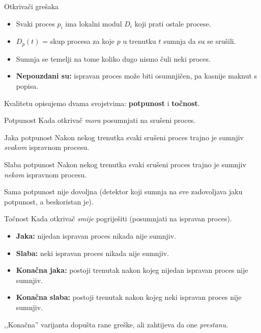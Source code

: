 \documentclass[aspectratio=169,11pt]{beamer}
\begin{document}
\begin{frame}{Otkrivači grešaka}
  \begin{itemize}
    \item Svaki proces $p_i$ ima lokalni modul $D_i$ koji prati ostale procese.
    \item $D_p(t)$ = skup procesa za koje $p$ u trenutku $t$ sumnja da su se
      srušili.
    \item Sumnja se temelji na tome koliko dugo nismo čuli neki proces.
    \item \textbf{Nepouzdani su:} ispravan proces može biti osumnjičen, pa kasnije
      maknut s popisa.
  \end{itemize}
  \vfill
  Kvalitetu opisujemo dvama svojstvima: \textbf{potpunost} i \textbf{točnost}.
\end{frame}

\begin{frame}{Potpunost}
  Kada otkrivač \emph{mora} posumnjati na srušeni proces.
  \begin{block}{Jaka potpunost}
    Nakon nekog trenutka svaki srušeni proces trajno je sumnjiv \emph{svakom}
    ispravnom procesu.
  \end{block}
  \begin{block}{Slaba potpunost}
    Nakon nekog trenutka svaki srušeni proces trajno je sumnjiv \emph{nekom}
    ispravnom procesu.
  \end{block}
  \vfill
  \footnotesize Sama potpunost nije dovoljna (detektor koji sumnja na sve
  zadovoljava jaku potpunost, a beskoristan je).
\end{frame}

\begin{frame}{Točnost}
  Kada otkrivač \emph{smije} pogriješiti (posumnjati na ispravan proces).
  \begin{itemize}
    \item \textbf{Jaka:} nijedan ispravan proces nikada nije sumnjiv.
    \item \textbf{Slaba:} neki ispravan proces nikada nije sumnjiv.
    \item \textbf{Konačna jaka:} postoji trenutak nakon kojeg nijedan ispravan
      proces nije sumnjiv.
    \item \textbf{Konačna slaba:} postoji trenutak nakon kojeg neki ispravan
      proces nije sumnjiv.
  \end{itemize}
  \vfill
  \footnotesize ,,Konačna'' varijanta dopušta rane greške, ali zahtijeva da one
  \emph{prestanu}.
\end{frame}
\end{document}
